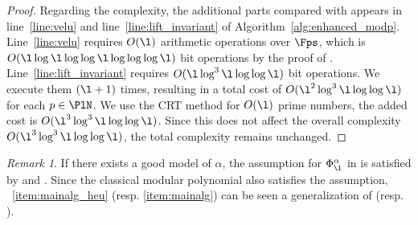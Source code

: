 \documentclass{amsart}
\theoremstyle{definition}
\theoremstyle{remark}
\newtheorem{remark}[theorem]{Remark}
\numberwithin{equation}{section}
\begin{document}
\begin{proof}
Regarding the complexity, 
the additional parts compared with \cite{deformation_Kunzweiler_2024} appears in 
line~\ref{line:velu} and
line~\ref{line:lift_invariant} of Algorithm~\ref{alg:enhanced_modp}. 
Line~\ref{line:velu} requires $O(\l)$ arithmetic operations over $\Fps$,
which is $O(\l\log\l\log\log\l\log\log\log\l)$ bit operations by the proof of \cite[Theorem 5.1]{deformation_Kunzweiler_2024}.
Line~\ref{line:lift_invariant} requires $O(\l\log^3\l\log\log\l)$ bit operations. 
We execute them $(\l+1)$ times, resulting in a total cost of $O(\l^2\log^3\l\log\log\l)$ for each $p\in\PlN$. 
We use the CRT method for $O(\l)$ prime numbers, 
the added cost is $O(\l^3\log^3\l\log\log\l)$. 
Since this does not affect the overall complexity $O(\l^3\log^3\l\log\log\l)$, the total complexity remains unchanged.
\end{proof}

\begin{remark}
    If there exists a good model of $\alpha$, 
    the assumption for $\Phi_{\l}^{\alpha}$ in  
    is satisfied by 
     and .
    Since the classical modular polynomial also satisfies the assumption,
    ~\eqref{item:mainalg_heu} (resp. \eqref{item:mainalg}) can be seen a generalization of \cite[Theorem 5.1]{deformation_Kunzweiler_2024} (resp. \cite[Theorem 5.2]{deformation_Kunzweiler_2024}).
\end{remark}








\end{document}

